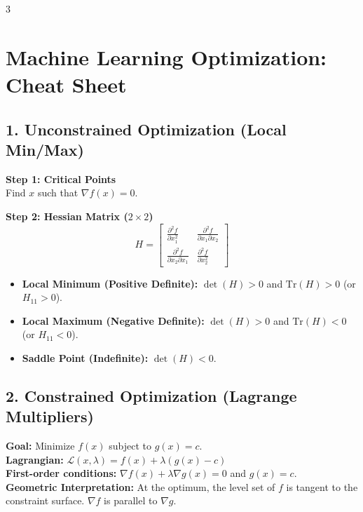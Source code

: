 \documentclass[10pt,landscape]{article}
\begin{document}
\scriptsize %
\begin{multicols*}{3} %

\setlength{\abovedisplayskip}{2pt}
\setlength{\belowdisplayskip}{2pt}
\setlength{\abovedisplayshortskip}{1pt}
\setlength{\belowdisplayshortskip}{1pt}

\section*{Machine Learning Optimization: Cheat Sheet}

\subsection*{1. Unconstrained Optimization (Local Min/Max)}
\textbf{Step 1: Critical Points} \\
Find $x$ such that $\nabla f(x) = 0$.

\textbf{Step 2: Hessian Matrix ($2 \times 2$)}
$$ H = \begin{bmatrix} \frac{\partial^2 f}{\partial x_1^2} & \frac{\partial^2 f}{\partial x_1 \partial x_2} \\ \frac{\partial^2 f}{\partial x_2 \partial x_1} & \frac{\partial^2 f}{\partial x_2^2} \end{bmatrix} $$
\begin{itemize}
    \item \textbf{Local Minimum (Positive Definite):} $\det(H) > 0$ and $\text{Tr}(H) > 0$ (or $H_{11} > 0$).
    \item \textbf{Local Maximum (Negative Definite):} $\det(H) > 0$ and $\text{Tr}(H) < 0$ (or $H_{11} < 0$).
    \item \textbf{Saddle Point (Indefinite):} $\det(H) < 0$.
\end{itemize}

\subsection*{2. Constrained Optimization (Lagrange Multipliers)}
\textbf{Goal:} Minimize $f(x)$ subject to $g(x) = c$. \\
\textbf{Lagrangian:} $\mathcal{L}(x, \lambda) = f(x) + \lambda (g(x) - c)$ \\
\textbf{First-order conditions:} $\nabla f(x) + \lambda \nabla g(x) = 0$ and $g(x) = c$. \\
\textbf{Geometric Interpretation:} At the optimum, the level set of $f$ is tangent to the constraint surface. $\nabla f$ is parallel to $\nabla g$.


\end{multicols*}
\end{document}
